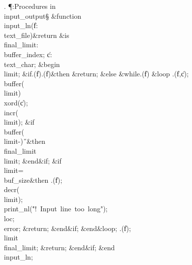 . \P\?:Procedures in \\{input\_output}\X\mathrel{+}\S\?\6
\&{function}\8\1\\{input\_ln}\?(\1\?\|f\?:\?\\{text\_file}\?\2)\&{return}\?\8%
\2\8\&{is}\8\1\6
\\{final\_limit}\?:\?\\{buffer\_index}\?\K{};\6
\|c\?:\?\\{text\_char};\6
\4\&{begin}\6
\\{limit}\?\K{};\6
\&{if}\1\1\?\8\R\?\?.\?\?\1(\?\|f\?\2)\ORE\?\?.\?\?\1(\?\|f\?\2)\?\2\8\&{then}\6
\?\&{return}\?\8;\6
\4\&{else}\6
\1\&{while}\?\8\R\?\?.\?\?\1(\?\|f\?\2)\?\8%
\&{loop}\6
\?.\?\?\1(\?\|f\?,\?\|c\?\2)\?;\5
\\{buffer}\?\1(\?\\{limit}\?\2)\K\?\\{xord}\?\1(\?\|c\?\2)\?;\5
\\{incr}\?\1(\?\\{limit}\?\2)\?;\6
\&{if}\1\1\8\\{buffer}\?\1(\?\\{limit}\?-\?\2)\I\?\H{\ }\2\8\&{then}\6
\\{final\_limit}\?\K\?\\{limit};\2\6
\&{end}\8\2\&{if}\1;\6
\&{if}\1\1\8\\{limit}\?=\?\\{buf\_size}\2\8\&{then}\6
\?.\?\?\1(\?\|f\?\2)\?;\5
\\{decr}\?\1(\?\\{limit}\?\2)\?;\6
\\{print\_nl}\?\1(\?\.{"!\ Input\ line\ too\ long"}\?\2)\?;\5
\\{loc}\?\K{};\5
\\{error};\5
\?\&{return}\?\8;\2\6
\&{end}\8\2\&{if}\1;\2\6
\&{end}\8\&{loop};\6
\?.\?\?\1(\?\|f\?\2)\?;\5
\\{limit}\?\K\?\\{final\_limit};\5
\?\&{return}\?\8;\2\6
\&{end}\8\2\&{if}\1;\2\6
\&{end}\8\\{input\_ln};\par
\fi

